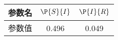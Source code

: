 \begin{tabular}{ccc}
\hline
参数名&$\P{S}{I}$&$\P{I}{R}$\\
\hline
参数值&0.496&0.049\\
\hline
\end{tabular}